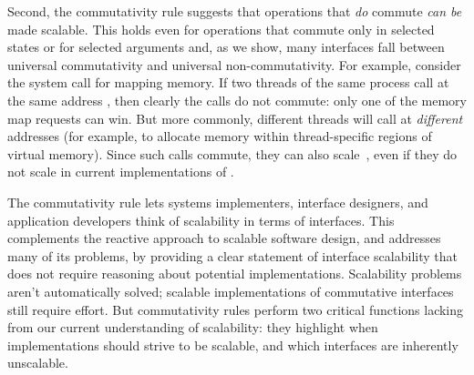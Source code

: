 Second, the commutativity rule suggests that operations that
\emph{do} commute \emph{can be} made scalable.
%
This holds even for operations that commute only in selected states or for
selected arguments and, as we show, many interfaces fall between
universal commutativity and universal non-commutativity.
%
For example, consider the  system call for mapping
memory.
%
If two threads of the same process call  at the same
address , then clearly the calls do not commute: only one
of the memory map requests can win.
%
But more commonly, different threads will call  at
\emph{different} addresses (for example, to allocate memory within
thread-specific regions of virtual memory).
%
Since such calls commute, they can also scale~\cite{clements:bonsai},
even if they do not scale in current implementations of
.

The commutativity rule lets systems implementers, interface
designers, and application developers think of scalability in terms of
interfaces.
%
This complements the reactive approach to scalable software design, and
addresses many of its problems, by providing a clear statement of
interface scalability that does not require reasoning about
potential implementations.
%
Scalability problems aren't automatically solved;
%
scalable implementations of commutative interfaces still require effort.
%
But commutativity rules perform two critical functions
lacking from our current understanding of scalability: they highlight
when implementations should strive to be scalable, and which interfaces
are inherently unscalable.

